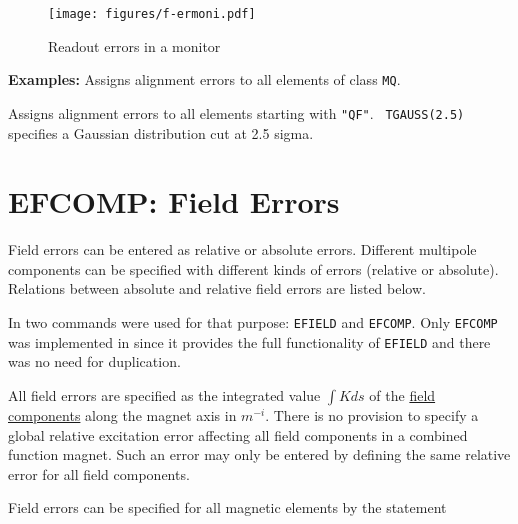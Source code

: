\begin{figure}[htb]
	\centering
	\setlength{\unitlength}{1pt}
	\texttt{[image: figures/f-ermoni.pdf]}
	\caption{Readout errors in a monitor}
	\label{F-ERMONI}
\end{figure}

\textbf{Examples:}
Assigns alignment errors to all elements of class \texttt{MQ}.

Assigns alignment errors to all elements starting with \texttt{"QF"}. \texttt{
TGAUSS(2.5)} specifies a Gaussian distribution cut at 2.5 sigma.


%

\section{EFCOMP: Field Errors}
\label{sec:efcomp}
Field errors can be entered as relative or absolute errors. Different
multipole components can be specified with different kinds of errors
(relative or absolute). Relations between absolute and relative field
errors are listed below.  

In \madeight two commands were used for that purpose: \texttt{EFIELD} 
and \texttt{EFCOMP}.
Only \texttt{EFCOMP} was implemented in \madx since it provides the full 
functionality
of \texttt{EFIELD} and there was no need for duplication.  

All field errors are specified as the integrated value $\int K ds$ 
of the \hyperref[sec:sign-convention]{field components} along the magnet axis 
in $m^{-i}$. There is no provision
to specify a global relative excitation error affecting all field
components in a combined function magnet. Such an error may only be
entered by defining the same relative error for all field components.  

Field errors can be specified for all magnetic elements by the statement  


